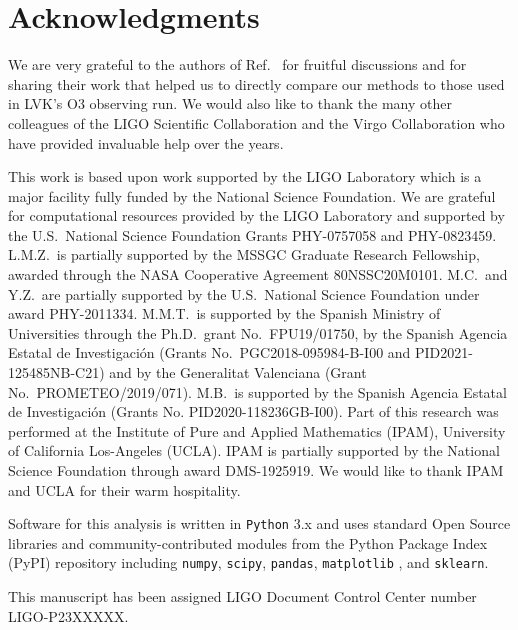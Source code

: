 \section*{Acknowledgments}

We are very grateful to the authors of Ref.~\cite{Chatterjee:2019avs} for fruitful discussions and for sharing their work that helped us to directly compare
our methods to those used in \ac{LVK}'s \ac{O3} observing run. We would also like to thank the many other colleagues of the LIGO Scientific Collaboration and
the Virgo Collaboration who have provided invaluable help over the years.

This work is based upon work supported by the LIGO Laboratory which is a major facility fully funded by the National Science Foundation. We are grateful for
computational resources provided by the LIGO Laboratory and supported by the U.S.\ National Science Foundation Grants PHY-0757058 and PHY-0823459. L.M.Z.\ is partially
supported by the MSSGC Graduate Research Fellowship, awarded through the NASA Cooperative Agreement 80NSSC20M0101. M.C.\ and Y.Z.\ are partially supported by the U.S.\
National Science Foundation under award PHY-2011334. M.M.T.\ is supported by the Spanish Ministry of Universities through the Ph.D.\ grant No.\ FPU19/01750, by the
Spanish Agencia Estatal de Investigaci\'on (Grants No.\ PGC2018-095984-B-I00 and PID2021-125485NB-C21) and by the Generalitat Valenciana (Grant No.\ PROMETEO/2019/071).
M.B.\ is supported by the Spanish Agencia Estatal de Investigaci\'on (Grants No. PID2020-118236GB-I00). Part of this research was performed at the Institute of Pure and
Applied Mathematics (IPAM),  University of California Los-Angeles (UCLA). IPAM is partially supported by the National Science Foundation through award
DMS-1925919. We would like to thank IPAM and UCLA for their warm hospitality. 

Software for this analysis is written in \texttt{Python} 3.x  and uses standard Open Source libraries and community-contributed modules from the Python Package Index (PyPI) repository  including \texttt{numpy}, \texttt{scipy}, \texttt{pandas}, \texttt{matplotlib} \cite{Hunter:2007ouj}, and \texttt{sklearn}.

This manuscript has been assigned LIGO Document Control Center number LIGO-P23XXXXX.





